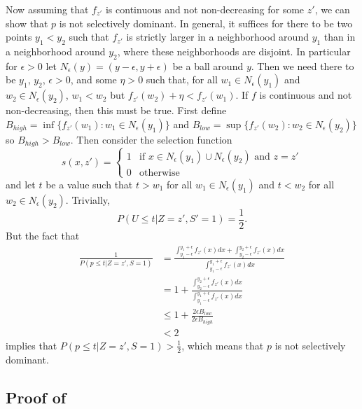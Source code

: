 \documentclass{article}
\begin{document}
\begin{appendix}
Now assuming that $f_{z'}$ is continuous and not non-decreasing for some $z'$, we can show that $p$ is not selectively dominant. In general, it suffices for there to be two points $y_1 < y_2$ such that $f_{z'}$ is strictly larger in a neighborhood around $y_1$ than in a neighborhood around $y_2$, where these neighborhoods are disjoint. In particular for $\epsilon > 0$ let $N_{\epsilon}(y) = (y - \epsilon, y + \epsilon )$ be a ball around $y$. Then we need there to be $y_1$, $y_2$, $\epsilon > 0$, and some $\eta > 0$ such that, for all $w_1 \in N_{\epsilon}(y_1)$ and $w_2 \in N_{\epsilon}(y_2)$, $w_1  < w_2$ but $f_{z'}(w_2) + \eta < f_{z'}(w_1) $. If $f$ is continuous and not non-decreasing, then this must be true. First define $B_{high} = \inf \{f_{z'}(w_1): w_1 \in N_{\epsilon}(y_1)\}$ and  $B_{low} = \sup \{f_{z'}(w_2): w_2 \in N_{\epsilon}(y_2)\}$ so $B_{high}  > B_{low}$. Then consider the selection function 
\begin{equation*}
s(x, z')= \begin{cases}
1 &\text{if } x \in N_{\epsilon}(y_1) \cup N_{\epsilon}(y_2) \text{ and } z=z' \\
0 &\text{otherwise }
\end{cases}
\end{equation*}
and let $t$ be a value such that $t > w_1$ for all $w_1 \in N_{\epsilon}(y_1)$ and $t < w_2$ for all $w_2 \in  N_{\epsilon}(y_2)$. Trivially, 
\begin{equation*}
    P(U \leq t | Z = z', S' = 1) = \frac{1}{2}. 
\end{equation*}
But the fact that 
\begin{align*}
    \frac{1}{P(p \leq t | Z=z', S = 1)} &= \frac{ \int_{y_1 - \epsilon}^{y_1 + \epsilon} f_{z'}(x) dx + \int_{y_2 - \epsilon}^{y_2 + \epsilon} f_{z'}(x) dx  }{\int_{y_1 - \epsilon}^{y_1 + \epsilon} f_{z'}(x) dx}\\
    &= 1 + \frac{ \int_{y_2 - \epsilon}^{y_2 + \epsilon} f_{z'}(x) dx  }{\int_{y_1 - \epsilon}^{y_1 + \epsilon} f_{z'}(x) dx}\\
    &\leq 1 + \frac{ 2\epsilon B_{low}  }{2\epsilon B_{high} }\\
    & < 2
\end{align*}
implies that $P(p \leq t |Z=z',  S = 1) > \frac{1}{2} $, which means that $p$ is not selectively dominant. 

\subsection{Proof of }


\end{appendix}
\end{document}
